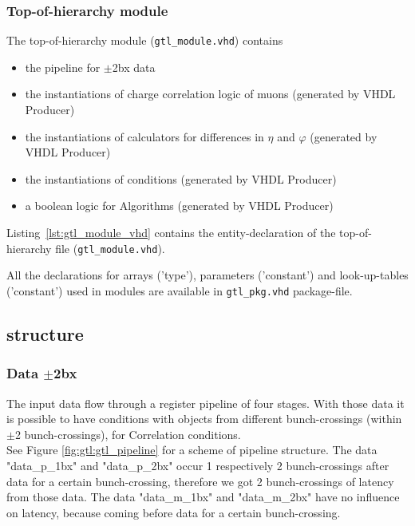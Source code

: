 \subsubsection{Top-of-hierarchy module}
\label{sec:gtl:top_module}

The top-of-hierarchy module (\texttt{gtl\_module.vhd}) contains
\begin {itemize}
\item the pipeline for $\pm$2bx data
\item the instantiations of charge correlation logic of muons (generated by VHDL Producer)
\item the instantiations of calculators for differences in $\eta$ and $\varphi$ (generated by VHDL Producer)
\item the instantiations of conditions (generated by VHDL Producer)
\item a boolean logic for Algorithms (generated by VHDL Producer)
\end {itemize}

Listing~\ref{lst:gtl_module_vhd} contains the entity-declaration of the top-of-hierarchy file (\texttt{gtl\_module.vhd}).



All the declarations for arrays ('type'), parameters ('constant') and look-up-tables ('constant') used in modules are available in \texttt{gtl\_pkg.vhd} package-file.

\clearpage

\subsection{\ugtl structure}
\label{sec:gtl:mgtl_structure}

\subsubsection{Data $\pm$2bx}
\label{sec:gtl:data_p_m_2bx}

The \ugtl input data flow through a register pipeline of four stages. With those data it is possible to have conditions with objects from
different bunch-crossings (within $\pm$2 bunch-crossings), \eg for Correlation conditions.\\
See Figure \ref{fig:gtl:gtl_pipeline} for a scheme of \ugtl pipeline structure. The data "data\_p\_1bx" and "data\_p\_2bx" occur 1 respectively 2 bunch-crossings
after data for a certain bunch-crossing, therefore we got 2 bunch-crossings of latency from those data. The data "data\_m\_1bx" and "data\_m\_2bx" have no influence
on latency, because coming before data for a certain bunch-crossing.

